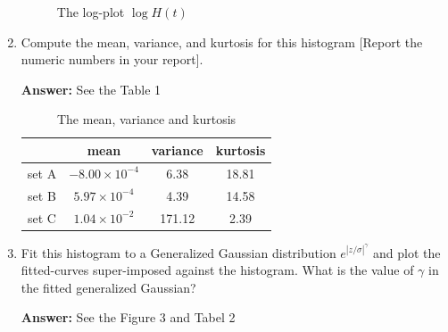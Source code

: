 \documentclass[11pt]{article}
\newcommand{\Answer}{\color{red}\textbf{Answer:} \color{black}}
\begin{document}
\begin{enumerate}
\begin{figure}[h]
{    }
    \caption{The log-plot $\log H(t)$}
\end{figure}

\item Compute the mean, variance, and kurtosis for this histogram [Report the numeric numbers in your report].

\Answer See the Table 1

\begin{table}[h]
    \centering
    \begin{tabular}{|c|c|c|c|}
        \hline
        & mean & variance & kurtosis \\
        \hline
        set A & $-8.00\times 10^{-4}$ & 6.38 & 18.81 \\
        \hline
        set B & $5.97\times 10^{-4}$ & 4.39 & 14.58 \\
        \hline
        set C & $1.04\times 10^{-2}$ & 171.12 & 2.39 \\
        \hline
    \end{tabular}
    \caption{The mean, variance and kurtosis}
\end{table}


\item Fit this histogram to a Generalized Gaussian distribution $e^{|z/\sigma|^\gamma}$ and plot the fitted-curves super-imposed against the histogram. What is the value of $\gamma$ in the fitted generalized Gaussian?

\Answer See the Figure 3 and Tabel 2


\end{enumerate}
\end{document}

